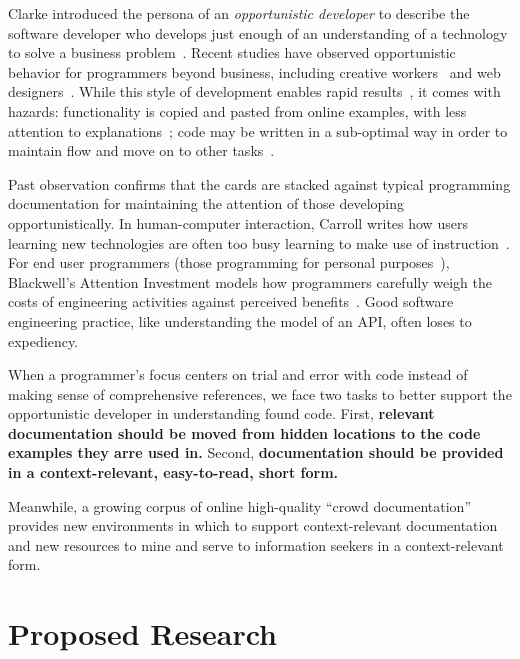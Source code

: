 \documentclass[12pt]{memoir}
\begin{document}
Clarke introduced the persona of an \emph{opportunistic developer} to describe the software developer who develops just enough of an understanding of a technology to solve a business problem~\cite{clarke_what_2007}.
Recent studies have observed opportunistic behavior for programmers beyond business, including creative workers~\cite{brandt_opportunistic_2008} and web designers~\cite{dorn_learning_2010}.
While this style of development enables rapid results~\cite{brandt_opportunistic_2008}, it comes with hazards:
functionality is copied and pasted from online examples, with less attention to explanations~\cite{brandt_two_2009};
code may be written in a sub-optimal way in order to maintain flow and move on to other tasks~\cite{brandt_opportunistic_2008}.

Past observation confirms that the cards are stacked against typical programming documentation for maintaining the attention of those developing opportunistically.
In human-computer interaction, Carroll writes how users learning new technologies are often too busy learning to make use of instruction~\cite{carroll_nurnberg_1990}.
For end user programmers (those programming for personal purposes~\cite{ko_state_2011}), Blackwell's Attention Investment models how programmers carefully weigh the costs of engineering activities against perceived benefits~\cite{blackwell_psychological_2006}.
Good software engineering practice, like understanding the model of an API, often loses to expediency.

When a programmer's focus centers on trial and error with code instead of making sense of comprehensive references, we face two tasks to better support the opportunistic developer in understanding found code.
First, \textbf{relevant documentation should be moved from hidden locations to the code examples they arre used in.}
Second, \textbf{documentation should be provided in a context-relevant, easy-to-read, short form.}

Meanwhile, a growing corpus of online high-quality ``crowd documentation''~\cite{parnin_crowd_2012} provides new environments in which to support context-relevant documentation and new resources to mine and serve to information seekers in a context-relevant form.

\section{Proposed Research}
\end{document}
